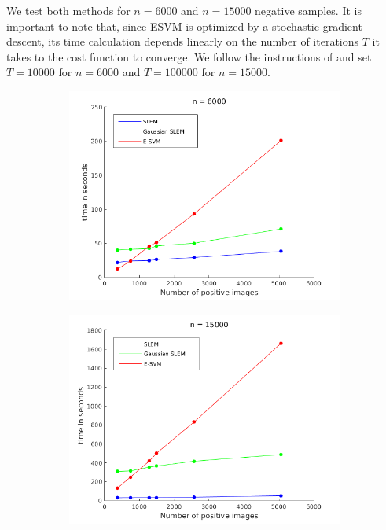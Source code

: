 We test both methods for $n=6000$ and $n=15000$ negative samples. It is important to note that, since ESVM is optimized by a stochastic gradient descent, its time calculation depends linearly on the number of iterations $T$ it takes to the cost function to converge. We follow the instructions of \cite{ZePe15} and set $T=10000$ for $n=6000$ and $T=100000$ for $n=15000$.
\begin{figure}[!h]
\centering
\begin{subfigure}[b]{0.32\textwidth}
\includegraphics[width=\textwidth]{speed_n_6K.png}
\end{subfigure}
\begin{subfigure}[b]{0.32\textwidth}
\includegraphics[width=\textwidth]{speed_n_15K.png}

\end{subfigure}
\end{figure}
